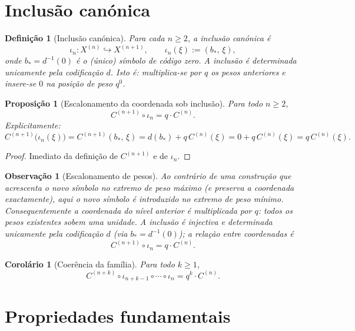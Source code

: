 \documentclass[11pt,a4paper]{article}
\newtheorem{definicao}{Definição}
\newtheorem{proposicao}{Proposição}
\newtheorem{observacao}{Observação}
\newtheorem{corolario}{Corolário}
\begin{document}
\section{Inclusão canónica}

\begin{definicao}[Inclusão canónica]
\label{def:iota-n}
Para cada \(n\ge 2\), a inclusão canónica é
\[
\iota_n\colon X^{(n)}\hookrightarrow X^{(n+1)},
\qquad
\iota_n(\xi)
:=
(b_\ast,\, \xi),
\]
onde \(b_\ast = d^{-1}(0)\) é o (único) símbolo de código zero.
A inclusão é determinada unicamente pela codificação \(d\).
Isto é: multiplica-se por \(q\) os pesos anteriores e insere-se \(0\) na posição de peso \(q^0\).
\end{definicao}

\begin{proposicao}[Escalonamento da coordenada sob inclusão]
\label{prop:escalonamento}
Para todo \(n\ge 2\),
\[
C^{(n+1)}\circ\iota_n
=
q\cdot C^{(n)}.
\]
Explicitamente:
\[
C^{(n+1)}\bigl(\iota_n(\xi)\bigr)
=
C^{(n+1)}(b_\ast,\, \xi)
=
d(b_\ast)
+
q\, C^{(n)}(\xi)
=
0
+
q\, C^{(n)}(\xi)
=
q\, C^{(n)}(\xi).
\]
\end{proposicao}

\begin{proof}
Imediato da definição de \(C^{(n+1)}\) e de \(\iota_n\).
\end{proof}

\begin{observacao}[Escalonamento de pesos]
\label{obs:escalonamento}
Ao contrário de uma construção que acrescenta o novo símbolo no extremo de peso máximo (e preserva a coordenada exactamente), aqui o novo símbolo é introduzido no extremo de peso mínimo.
Consequentemente a coordenada do nível anterior é multiplicada por \(q\): todos os pesos existentes sobem uma unidade.
A inclusão é injectiva e determinada unicamente pela codificação \(d\) (via \(b_\ast=d^{-1}(0)\)); a relação entre coordenadas é
\[
C^{(n+1)}\circ\iota_n
=
q\cdot C^{(n)}.
\]
\end{observacao}

\begin{corolario}[Coerência da família]
\label{cor:coerencia}
Para todo \(k\ge 1\),
\[
C^{(n+k)}\circ\iota_{n+k-1}\circ\cdots\circ\iota_n
=
q^k\cdot C^{(n)}.
\]
\end{corolario}

\section{Propriedades fundamentais}
\end{document}
